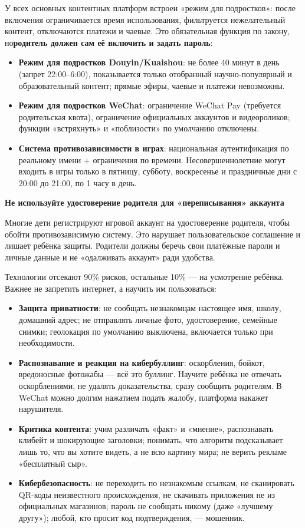 У всех основных контентных платформ встроен «режим для подростков»: после включения ограничивается время использования, фильтруется нежелательный контент, отключаются платежи и чаевые. Это обязательная функция по закону, но\textbf{родитель должен сам её включить и задать пароль}:

\begin{itemize}
  \item \textbf{Режим для подростков Douyin/Kuaishou}: не более 40 минут в день (запрет 22:00–6:00), показывается только отобранный научно-популярный и образовательный контент; прямые эфиры, чаевые и платежи невозможны.
  \item \textbf{Режим для подростков WeChat}: ограничение WeChat Pay (требуется родительская квота), ограничение официальных аккаунтов и видеороликов; функции «встряхнуть» и «поблизости» по умолчанию отключены.
  \item \textbf{Система противозависимости в играх}: национальная аутентификация по реальному имени + ограничения по времени. Несовершеннолетние могут входить в игры только в пятницу, субботу, воскресенье и праздничные дни с 20:00 до 21:00, по 1 часу в день.
\end{itemize}

\textbf{Не используйте удостоверение родителя для «переписывания» аккаунта}\par

Многие дети регистрируют игровой аккаунт на удостоверение родителя, чтобы обойти противозависимую систему. Это нарушает пользовательское соглашение и лишает ребёнка защиты. Родители должны беречь свои платёжные пароли и личные данные и не «одалживать аккаунт» ради удобства.


Технологии отсекают 90\% рисков, остальные 10\% — на усмотрение ребёнка. Важнее не запретить интернет, а научить им пользоваться:

\begin{itemize}
  \item \textbf{Защита приватности}: не сообщать незнакомцам настоящее имя, школу, домашний адрес; не отправлять личные фото, удостоверение, семейные снимки; геолокация по умолчанию выключена, включается только при необходимости.
  \item \textbf{Распознавание и реакция на кибербуллинг}: оскорбления, бойкот, вредоносные фотожабы — всё это буллинг. Научите ребёнка не отвечать оскорблениями, не удалять доказательства, сразу сообщить родителям. В WeChat можно долгим нажатием подать жалобу, платформа накажет нарушителя.
  \item \textbf{Критика контента}: учим различать «факт» и «мнение», распознавать клибейт и шокирующие заголовки; понимать, что алгоритм подсказывает лишь то, что вы хотите видеть, а не всю картину мира; не верить рекламе «бесплатный сыр».
  \item \textbf{Кибербезопасность}: не переходить по незнакомым ссылкам, не сканировать QR-коды неизвестного происхождения, не скачивать приложения не из официальных магазинов; пароль не сообщать никому (даже «лучшему другу»); любой, кто просит код подтверждения, — мошенник.
\end{itemize}

